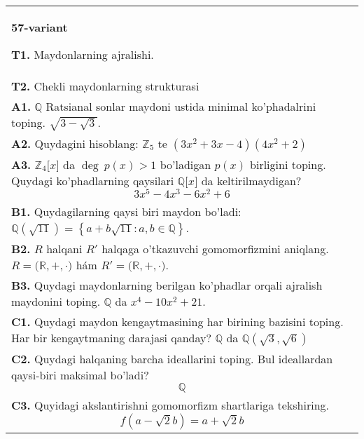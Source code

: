 \documentclass{article}
\begin{document}
\begin{tabular}{m{17cm}}
\textbf{57-variant}
\newline

\textbf{T1.} Maydonlarning ajralishi. \\
\textbf{T2.} Chekli maydonlarning strukturasi \\
\textbf{A1.} \(\mathbb{Q}\) Ratsianal sonlar maydoni ustida minimal ko'phadalrini toping.
\(\sqrt{3 - \sqrt{3}}\). \\
\textbf{A2.} Quydagini hisoblang:
\(\mathbb{Z}_{5}\) te \(\left( 3x^{2} + 3x - 4 \right)\left( 4x^{2} + 2 \right)\) \\
\textbf{A3.} \(\mathbb{Z}_{4}\lbrack x\rbrack\) da \(\deg\ p(x) > 1\) bo'ladigan \(p(x)\) birligini toping. Quydagi ko'phadlarning qaysilari \(\mathbb{Q\lbrack}x\rbrack\) da keltirilmaydigan?
\[3x^{5} - 4x^{3} - 6x^{2} + 6\] \\
\textbf{B1.} Quydagilarning qaysi biri maydon bo'ladi:
\(\mathbb{Q}\left( \sqrt{11} \right) = \left\{ a + b\sqrt{11}:a,b \in \mathbb{Q} \right\}\). \\
\textbf{B2.} \(R\) halqani \(R'\) halqaga o'tkazuvchi gomomorfizmini aniqlang.
\(R\mathbb{= (R,} + , \cdot )\) hám \(R'\mathbb{= (R,} + , \cdot )\). \\
\textbf{B3.} Quydagi maydonlarning berilgan ko'phadlar orqali ajralish maydonini toping.
\(\mathbb{Q}\) da \(x^{4} - 10x^{2} + 21\). \\
\textbf{C1.} Quydagi maydon kengaytmasining har birining bazisini toping. Har bir kengaytmaning darajasi qanday?
\(\mathbb{Q}\) da \(\mathbb{Q}\left( \sqrt{3},\sqrt{6} \right)\) \\
\textbf{C2.} Quydagi halqaning barcha ideallarini toping. Bul ideallardan qaysi-biri maksimal bo'ladi?
\[\mathbb{Q}\] \\
\textbf{C3.} Quyidagi akslantirishni gomomorfizm shartlariga tekshiring.
\[f\left( a - \sqrt{2}b \right) = a + \sqrt{2}b\] \\

\end{tabular}
\vspace{1cm}
\end{document}
